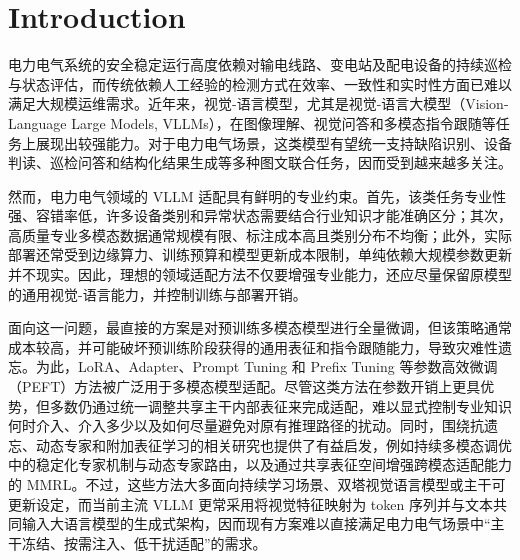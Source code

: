 \documentclass[journal]{IEEEtran}
\begin{document}
\IEEEdisplaynontitleabstractindextext
\IEEEpeerreviewmaketitle




\section{Introduction}

电力电气系统的安全稳定运行高度依赖对输电线路、变电站及配电设备的持续巡检与状态评估，而传统依赖人工经验的检测方式在效率、一致性和实时性方面已难以满足大规模运维需求\cite{rocha2025advances,liu2026review}。近年来，视觉-语言模型，尤其是视觉-语言大模型（Vision-Language Large Models, VLLMs），在图像理解、视觉问答和多模态指令跟随等任务上展现出较强能力\cite{zhang2024vision}。对于电力电气场景，这类模型有望统一支持缺陷识别、设备判读、巡检问答和结构化结果生成等多种图文联合任务，因而受到越来越多关注\cite{wang2024power,hao2025power}。

然而，电力电气领域的 VLLM 适配具有鲜明的专业约束。首先，该类任务专业性强、容错率低，许多设备类别和异常状态需要结合行业知识才能准确区分；其次，高质量专业多模态数据通常规模有限、标注成本高且类别分布不均衡\cite{lin2025defectgpt}；此外，实际部署还常受到边缘算力、训练预算和模型更新成本限制，单纯依赖大规模参数更新并不现实\cite{sharshar2025vision,jeon2026edgev}。因此，理想的领域适配方法不仅要增强专业能力，还应尽量保留原模型的通用视觉-语言能力，并控制训练与部署开销。

面向这一问题，最直接的方案是对预训练多模态模型进行全量微调，但该策略通常成本较高，并可能破坏预训练阶段获得的通用表征和指令跟随能力，导致灾难性遗忘\cite{zhai2023investigating,zhu2024model}。为此，LoRA、Adapter、Prompt Tuning 和 Prefix Tuning 等参数高效微调（PEFT）方法被广泛用于多模态模型适配\cite{hu2022lora,zhou2024empirical,wang2025parameter}。尽管这类方法在参数开销上更具优势，但多数仍通过统一调整共享主干内部表征来完成适配，难以显式控制专业知识何时介入、介入多少以及如何尽量避免对原有推理路径的扰动\cite{wu2026domain}。同时，围绕抗遗忘、动态专家和附加表征学习的相关研究也提供了有益启发，例如持续多模态调优中的稳定化专家机制与动态专家路由\cite{tuning83same,ge2025dynamic}，以及通过共享表征空间增强跨模态适配能力的 MMRL\cite{guo2025mmrl}。不过，这些方法大多面向持续学习场景、双塔视觉语言模型或主干可更新设定，而当前主流 VLLM 更常采用将视觉特征映射为 token 序列并与文本共同输入大语言模型的生成式架构\cite{radford2021learning,liu2023visual,bai2025qwen3}，因而现有方案难以直接满足电力电气场景中“主干冻结、按需注入、低干扰适配”的需求。
\end{document}
